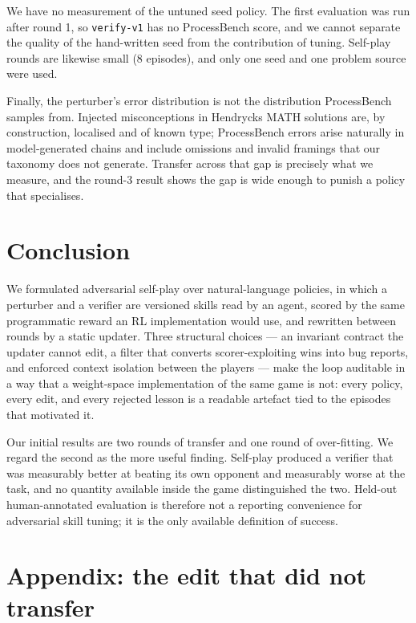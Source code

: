 \documentclass{article} %
\begin{document}
We have no measurement of the untuned seed policy. The first evaluation was run after round
1, so \texttt{verify-v1} has no ProcessBench score, and we cannot separate the quality of the
hand-written seed from the contribution of tuning. Self-play rounds are likewise small (8
episodes), and only one seed and one problem source were used.

Finally, the perturber's error distribution is not the distribution ProcessBench samples
from. Injected misconceptions in Hendrycks MATH solutions are, by construction, localised and
of known type; ProcessBench errors arise naturally in model-generated chains and include
omissions and invalid framings that our taxonomy does not generate. Transfer across that gap
is precisely what we measure, and the round-3 result shows the gap is wide enough to punish
a policy that specialises.

\section{Conclusion}

We formulated adversarial self-play over natural-language policies, in which a perturber and
a verifier are versioned skills read by an agent, scored by the same programmatic reward an
RL implementation would use, and rewritten between rounds by a static updater. Three
structural choices --- an invariant contract the updater cannot edit, a filter that converts
scorer-exploiting wins into bug reports, and enforced context isolation between the players
--- make the loop auditable in a way that a weight-space implementation of the same game is
not: every policy, every edit, and every rejected lesson is a readable artefact tied to the
episodes that motivated it.

Our initial results are two rounds of transfer and one round of over-fitting. We regard the
second as the more useful finding. Self-play produced a verifier that was measurably better
at beating its own opponent and measurably worse at the task, and no quantity available
inside the game distinguished the two. Held-out human-annotated evaluation is therefore not
a reporting convenience for adversarial skill tuning; it is the only available definition of
success.




\appendix
\section{Appendix: the edit that did not transfer}
\label{app:diff}
\end{document}
